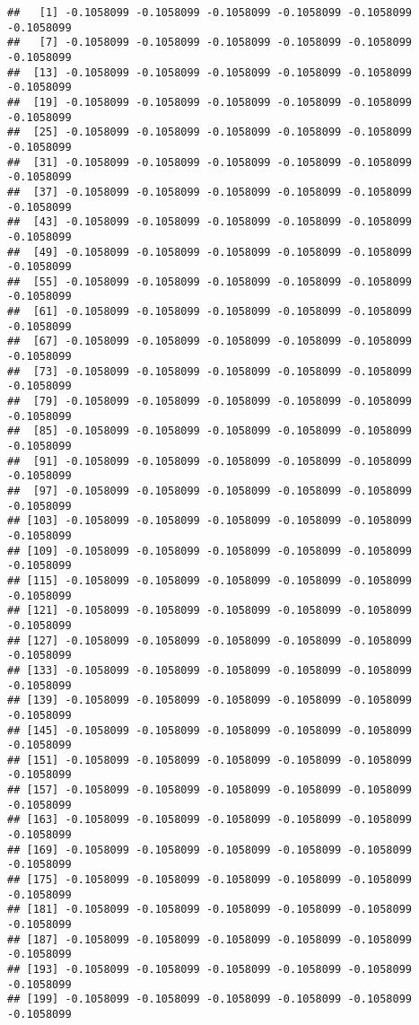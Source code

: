 \documentclass[
]{article}
\begin{document}
\begin{verbatim}
##   [1] -0.1058099 -0.1058099 -0.1058099 -0.1058099 -0.1058099 -0.1058099
##   [7] -0.1058099 -0.1058099 -0.1058099 -0.1058099 -0.1058099 -0.1058099
##  [13] -0.1058099 -0.1058099 -0.1058099 -0.1058099 -0.1058099 -0.1058099
##  [19] -0.1058099 -0.1058099 -0.1058099 -0.1058099 -0.1058099 -0.1058099
##  [25] -0.1058099 -0.1058099 -0.1058099 -0.1058099 -0.1058099 -0.1058099
##  [31] -0.1058099 -0.1058099 -0.1058099 -0.1058099 -0.1058099 -0.1058099
##  [37] -0.1058099 -0.1058099 -0.1058099 -0.1058099 -0.1058099 -0.1058099
##  [43] -0.1058099 -0.1058099 -0.1058099 -0.1058099 -0.1058099 -0.1058099
##  [49] -0.1058099 -0.1058099 -0.1058099 -0.1058099 -0.1058099 -0.1058099
##  [55] -0.1058099 -0.1058099 -0.1058099 -0.1058099 -0.1058099 -0.1058099
##  [61] -0.1058099 -0.1058099 -0.1058099 -0.1058099 -0.1058099 -0.1058099
##  [67] -0.1058099 -0.1058099 -0.1058099 -0.1058099 -0.1058099 -0.1058099
##  [73] -0.1058099 -0.1058099 -0.1058099 -0.1058099 -0.1058099 -0.1058099
##  [79] -0.1058099 -0.1058099 -0.1058099 -0.1058099 -0.1058099 -0.1058099
##  [85] -0.1058099 -0.1058099 -0.1058099 -0.1058099 -0.1058099 -0.1058099
##  [91] -0.1058099 -0.1058099 -0.1058099 -0.1058099 -0.1058099 -0.1058099
##  [97] -0.1058099 -0.1058099 -0.1058099 -0.1058099 -0.1058099 -0.1058099
## [103] -0.1058099 -0.1058099 -0.1058099 -0.1058099 -0.1058099 -0.1058099
## [109] -0.1058099 -0.1058099 -0.1058099 -0.1058099 -0.1058099 -0.1058099
## [115] -0.1058099 -0.1058099 -0.1058099 -0.1058099 -0.1058099 -0.1058099
## [121] -0.1058099 -0.1058099 -0.1058099 -0.1058099 -0.1058099 -0.1058099
## [127] -0.1058099 -0.1058099 -0.1058099 -0.1058099 -0.1058099 -0.1058099
## [133] -0.1058099 -0.1058099 -0.1058099 -0.1058099 -0.1058099 -0.1058099
## [139] -0.1058099 -0.1058099 -0.1058099 -0.1058099 -0.1058099 -0.1058099
## [145] -0.1058099 -0.1058099 -0.1058099 -0.1058099 -0.1058099 -0.1058099
## [151] -0.1058099 -0.1058099 -0.1058099 -0.1058099 -0.1058099 -0.1058099
## [157] -0.1058099 -0.1058099 -0.1058099 -0.1058099 -0.1058099 -0.1058099
## [163] -0.1058099 -0.1058099 -0.1058099 -0.1058099 -0.1058099 -0.1058099
## [169] -0.1058099 -0.1058099 -0.1058099 -0.1058099 -0.1058099 -0.1058099
## [175] -0.1058099 -0.1058099 -0.1058099 -0.1058099 -0.1058099 -0.1058099
## [181] -0.1058099 -0.1058099 -0.1058099 -0.1058099 -0.1058099 -0.1058099
## [187] -0.1058099 -0.1058099 -0.1058099 -0.1058099 -0.1058099 -0.1058099
## [193] -0.1058099 -0.1058099 -0.1058099 -0.1058099 -0.1058099 -0.1058099
## [199] -0.1058099 -0.1058099 -0.1058099 -0.1058099 -0.1058099 -0.1058099

\end{verbatim}
\end{document}

